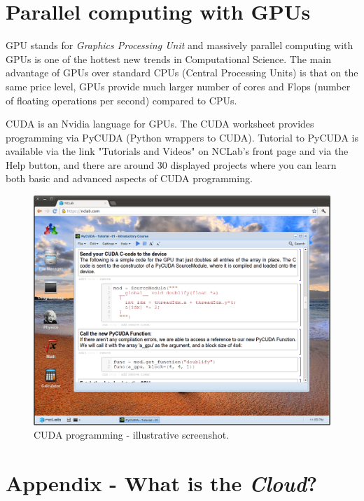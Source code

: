\documentclass{article}
\begin{document}
\section{Parallel computing with GPUs}

GPU stands for {\em Graphics Processing Unit} and massively parallel computing with GPUs
is one of the hottest new trends in Computational Science. The main advantage 
of GPUs over standard CPUs (Central Processing Units) is that on the same price 
level, GPUs provide much larger number of cores and Flops (number of floating 
operations per second) compared to CPUs.
 
CUDA is an Nvidia language for GPUs. The CUDA worksheet provides programming via 
PyCUDA (Python wrappers to CUDA). Tutorial to PyCUDA is available via the link "Tutorials and Videos" 
on NCLab's front page and via the Help button, and there are around 30 
displayed projects where you can learn both basic and advanced aspects of CUDA
programming. 

\begin{figure}[!ht]
\begin{center}
\includegraphics[width=\textwidth]{img/progr4.png}
\end{center}
\caption{CUDA programming - illustrative screenshot.}
\label{fig:progr4}
\end{figure}
\noindent

\section{Appendix - What is the {\em Cloud}?}
\end{document}
